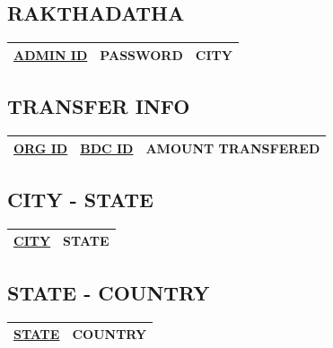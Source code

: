 \begin{sloppypar}
\subsection{RAKTHADATHA}

\begin{tabular}{ | c | c | c | }
 \hline
 \underline{ADMIN ID} & PASSWORD & CITY \\
 \hline
\end{tabular}

\subsection{TRANSFER INFO}

\begin{tabular}{ | c | c | c |}
 \hline
 \underline{ORG ID} & \underline{BDC ID} & AMOUNT TRANSFERED \\
 \hline
\end{tabular}

\subsection{CITY - STATE}

\begin{tabular}{ | c | c | }
 \hline
 \underline{CITY} & STATE \\
 \hline
\end{tabular}

\subsection{STATE - COUNTRY}

\begin{tabular}{ | c | c | }
 \hline
 \underline{STATE} & COUNTRY \\
 \hline
\end{tabular}
\end{sloppypar}

